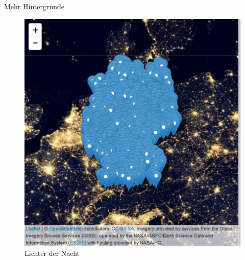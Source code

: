 \documentclass[ignorenonframetext,]{beamer}
\newenvironment{Shaded}{\begin{snugshade}}{\end{snugshade}}
\newcommand{\KeywordTok}[1]{\textcolor[rgb]{0.26,0.66,0.93}{\textbf{#1}}}
\newcommand{\StringTok}[1]{\textcolor[rgb]{0.02,0.61,0.04}{#1}}
\newcommand{\OperatorTok}[1]{\textcolor[rgb]{0.74,0.68,0.62}{#1}}
\newcommand{\NormalTok}[1]{\textcolor[rgb]{0.74,0.68,0.62}{#1}}
\begin{document}
\begin{frame}[fragile]{\href{http://leaflet-extras.github.io/leaflet-providers/preview/index.html}{Mehr
Hintergründe}}

\begin{Shaded}
\end{Shaded}

\begin{figure}
\centering
\includegraphics{figure/LightsInteractive.PNG}
\caption{Lichter der Nacht}
\end{figure}

\end{frame}
\end{document}
